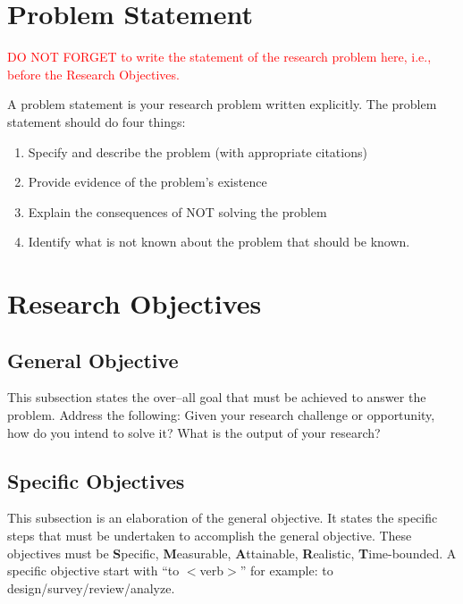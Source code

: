\section{Problem Statement}
\textcolor{red}{DO NOT FORGET to write the statement of the research problem here, i.e., before the Research Objectives.}

A problem statement is your research problem written explicitly.  
The problem statement should do four things: 
\begin{enumerate}
	\item Specify and describe the problem (with appropriate citations) 
	\item  Provide evidence of the problem’s existence  
	\item Explain the consequences of NOT solving the problem  
	\item 	Identify what is not known about the problem that should be known.
\end{enumerate}


\section{Research Objectives}
\label{sec:researchobjectives}

\subsection{General Objective}
\label{sec:generalobjective}

This subsection states the over--all goal that must be achieved to answer the problem.
Address the following: Given your research challenge or opportunity, how do you intend  to solve it? What is the output of your research?


\subsection{Specific Objectives}
\label{sec:specificobjectives}

%
%

This subsection is an elaboration of the general objective.  
It states the specific steps that must be undertaken to accomplish the general objective.  
These objectives must be \textbf{S}pecific, \textbf{M}easurable, \textbf{A}ttainable, \textbf{R}ealistic, \textbf{T}ime-bounded.  
A specific objective start with ``to $<$verb$>$'' for example: to design/survey/review/analyze.

